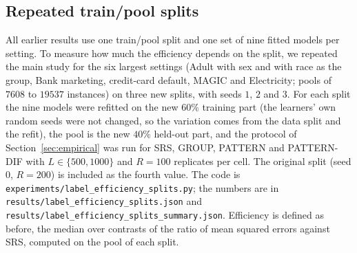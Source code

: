 \documentclass[pdflatex,sn-mathphys-num,iicol]{sn-jnl}
\theoremstyle{thmstyleone}
\theoremstyle{thmstyletwo}
\theoremstyle{thmstylethree}
\begin{document}
\begin{table}[t]\centering\footnotesize
\caption{Quality of inference by budget. Mean: coverage of nominal 95\% intervals averaged over estimands and cells; worst: the lowest coverage of any estimand in any cell. ``+ floor'': Wald intervals with the zero-variance safeguard. Fail: largest share of samples with an undefined estimate (SRS only).}\label{tab:inference}

\end{table}

\subsection{Repeated train/pool splits}\label{sec:splits}

All earlier results use one train/pool split and one set of nine fitted models per setting. To measure how much the efficiency depends on the split, we repeated the main study for the six largest settings (Adult with sex and with race as the group, Bank marketing, credit-card default, MAGIC and Electricity; pools of $7608$ to $19537$ instances) on three new splits, with seeds $1$, $2$ and $3$. For each split the nine models were refitted on the new $60\%$ training part (the learners' own random seeds were not changed, so the variation comes from the data split and the refit), the pool is the new $40\%$ held-out part, and the protocol of Section~\ref{sec:empirical} was run for SRS, GROUP, PATTERN and PATTERN-DIF with $L\in\{500,1000\}$ and $R=100$ replicates per cell. The original split (seed $0$, $R=200$) is included as the fourth value. The code is \texttt{experiments/label\_efficiency\_splits.py}; the numbers are in \texttt{results/label\_efficiency\_splits.json} and \texttt{results/label\_\allowbreak efficiency\_\allowbreak splits\_\allowbreak summary.json}. Efficiency is defined as before, the median over contrasts of the ratio of mean squared errors against SRS, computed on the pool of each split.
\end{document}
